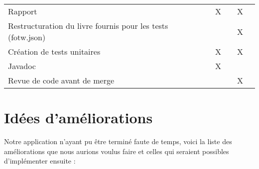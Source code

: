 \begin{centering}
\begin{longtable}{|p{8cm}|c|c|c|c|}
			\rowcolor{lightgray} \multicolumn{5}{|c|}{ \textbf{Autre}}\\
			\hline
			Rapport & X & & X & \\
			\hline
			Restructuration du livre fournis pour les tests (fotw.json) & & & X & \\
			\hline
			Création de tests unitaires & X & & X & \\
			\hline
			Javadoc & X & & & \\
			\hline
			Revue de code avant de merge & & & X & \\
			\hline
		\end{longtable}
	\end{centering}

	\section{Idées d'améliorations}

		Notre application n'ayant pu être terminé faute de temps, voici la liste des améliorations que nous aurions voulus faire et celles qui seraient possibles d'implémenter ensuite :

